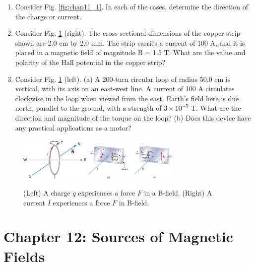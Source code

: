 \documentclass[10pt]{article}
\begin{document}
\begin{enumerate}
\item Consider Fig. \ref{fig:chap11_1}.  In each of the cases, determine the direction of the charge or current. \\ \vspace{1cm}
\item Consider Fig. \ref{fig:chap11_2} (right). The cross-sectional dimensions of the copper strip shown are 2.0 cm by 2.0 mm. The strip carries a current of 100 A, and it is placed in a magnetic field of magnitude B = 1.5 T. What are the value and polarity of the Hall potential in the copper strip? \\ \vspace{2cm}
\item Consider Fig. \ref{fig:chap11_2} (left). (a) A 200-turn circular loop of radius 50.0 cm is vertical, with its axis on an east-west line. A current of 100 A circulates clockwise in the loop when viewed from the east. Earth’s field here is due north, parallel to the ground, with a strength of $3 \times 10^{-5}$ T.  What are the direction and magnitude of the torque on the loop? (b) Does this device have any practical applications as a motor? \\ \vspace{1cm}
\end{enumerate}

\begin{figure}[hb]
\centering
\includegraphics[width=0.3\textwidth]{torqueLoop.jpeg} \hspace{1cm}
\includegraphics[width=0.4\textwidth]{hallEffect1.jpeg}
\caption{\label{fig:chap11_2} (Left) A charge $q$ experiences a force $F$ in a B-field. (Right) A current $I$ experiences a force $F$ in B-field.}
\end{figure}

\section{Chapter 12: Sources of Magnetic Fields}
\end{document}
